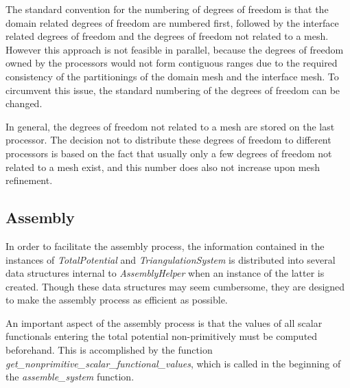\documentclass[pdftex,a4paper,12pt,abstracton]{scrartcl}
\begin{document}
The standard convention for the numbering of degrees of freedom is that the domain related degrees of freedom are numbered first, followed by the interface related degrees of freedom and the degrees of freedom not related to a mesh. However this approach is not feasible in parallel, because the degrees of freedom owned by the processors would not form contiguous ranges due to the required consistency of the partitionings of the domain mesh and the interface mesh. To circumvent this issue, the standard numbering of the degrees of freedom can be changed.

In general, the degrees of freedom not related to a mesh are stored on the last processor. The decision not to distribute these degrees of freedom to different processors is based on the fact that usually only a few degrees of freedom not related to a mesh exist, and this number does also not increase upon mesh refinement.

\subsection{Assembly}
In order to facilitate the assembly process, the information contained in the instances of \textit{TotalPotential} and \textit{TriangulationSystem} is distributed into several data structures internal to \textit{AssemblyHelper} when an instance of the latter is created. Though these data structures may seem cumbersome, they are designed to make the assembly process as efficient as possible.

An important aspect of the assembly process is that the values of all scalar functionals entering the total potential non-primitively must be computed beforehand. This is accomplished by the function \textit{get\_nonprimitive\_scalar\_functional\_values}, which is called in the beginning of the \textit{assemble\_system} function.
\end{document}
